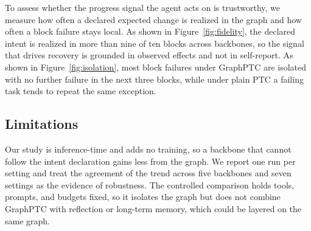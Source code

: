 To assess whether the progress signal the agent acts on is trustworthy, we measure how often a declared expected change is realized in the graph and how often a block failure stays local.
As shown in Figure~\ref{fig:fidelity}, the declared intent is realized in more than nine of ten blocks across backbones, so the signal that drives recovery is grounded in observed effects and not in self-report.
As shown in Figure~\ref{fig:isolation}, most block failures under GraphPTC are isolated with no further failure in the next three blocks, while under plain PTC a failing task tends to repeat the same exception.

\subsection{Limitations}

Our study is inference-time and adds no training, so a backbone that cannot follow the intent declaration gains less from the graph.
We report one run per setting and treat the agreement of the trend across five backbones and seven settings as the evidence of robustness.
The controlled comparison holds tools, prompts, and budgets fixed, so it isolates the graph but does not combine GraphPTC with reflection or long-term memory, which could be layered on the same graph.
